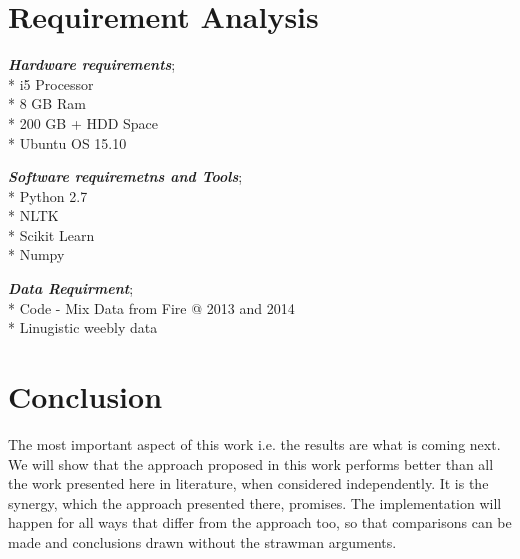 \documentclass[12pt]{article}
\begin{document}
\section{Requirement Analysis}

\begin{itemize*}
  \item \textbf{\textit{Hardware requirements}}; \\
      \hspace{20em}* i5 Processor\\
      \hspace{20em}* 8 GB Ram\\
      \hspace{20em}* 200 GB + HDD Space\\
      \hspace{20em}* Ubuntu OS 15.10\\

  \item \textbf{\textit{Software requiremetns and Tools}}; \\
      \hspace{20em}* Python 2.7\\
      \hspace{20em}* NLTK\\
      \hspace{20em}* Scikit Learn\\
      \hspace{20em}* Numpy\\

  \item \textbf{\textit{Data Requirment}}; \\
      \hspace{20em}* Code - Mix Data from Fire @ 2013 and 2014\\
      \hspace{20em}* Linugistic weebly data \cite{sharma_text_2015}\\


\end{itemize*}

\section{Conclusion}

\fontsize{12}{20}\selectfont The most important aspect of this work i.e. the results are what is coming
next. We will show that the approach proposed in this work performs better than
all the work presented here in literature, when considered independently. It is
the synergy, which the approach presented there, promises. The implementation
will happen for all ways that differ from the approach too, so that comparisons
can be made and conclusions drawn without the strawman arguments. \\
\end{document}
